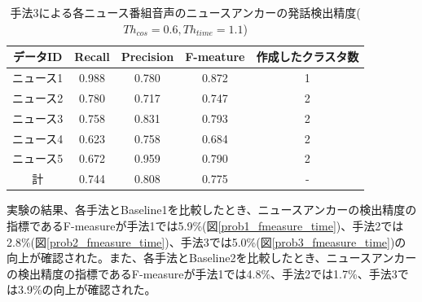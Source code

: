 \begin{table}[H]
  \begin{center}
    \caption{手法3による各ニュース番組音声のニュースアンカーの発話検出精度($Th_{cos}=0.6,Th_{time}=1.1$) \label{table:prob3_eachnews_time}}
    \begin{tabular}{|c||c|c|c|c|} \hline
データID & Recall & Precision & F-meature & 作成したクラスタ数\\ \hline
ニュース1 & 0.988 & 0.780 & 0.872 & 1 \\ \hline
ニュース2 & 0.780 & 0.717 & 0.747 & 2 \\ \hline
ニュース3 & 0.758 & 0.831 & 0.793 & 2 \\ \hline
ニュース4 & 0.623 & 0.758 & 0.684 & 2 \\ \hline
ニュース5 & 0.672 & 0.959 & 0.790 & 2 \\ \hline
計 & 0.744 & 0.808 & 0.775 & - \\ \hline
    \end{tabular}
  \end{center}
\end{table}

実験の結果、各手法とBaseline1を比較したとき、ニュースアンカーの検出精度の指標であるF-measureが手法1では5.9\%(図\ref{prob1_fmeasure_time})、手法2では2.8\%(図\ref{prob2_fmeasure_time})、手法3では5.0\%(図\ref{prob3_fmeasure_time})の向上が確認された。また、各手法とBaseline2を比較したとき、ニュースアンカーの検出精度の指標であるF-measureが手法1では4.8\%、手法2では1.7\%、手法3では3.9\%の向上が確認された。
